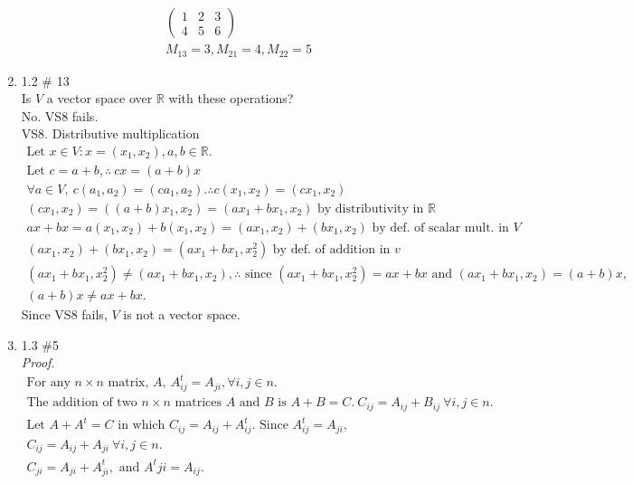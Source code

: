 \documentclass{article}
\begin{document}
\begin{enumerate}
\begin{gather*}
\begin{pmatrix}
            1 & 2 & 3 \\
            4 & 5 & 6
        \end{pmatrix} \\
        M_{13} = 3, M_{21} = 4, M_{22} = 5
    \end{gather*}
    \item 1.2 \# 13 \\
    Is $V$ a vector space over $\mathbb{R}$ with these operations? \\
    No. VS8 fails. \\
    VS8. Distributive multiplication
    \begin{gather*}
        \textrm{Let } x \in V : x = (x_1,x_2), a,b \in \mathbb{R}. \\
        \textrm{Let } c = a+b, \therefore \ cx = (a+b)x \\
        \forall a \in V, \ c(a_1,a_2) = (ca_1,a_2). \therefore c(x_1,x_2) = (cx_1,x_2) \\
        (cx_1,x_2) = ((a+b)x_1, x_2) = (ax_1 + bx_1, x_2) \textrm{ by distributivity in $\mathbb{R}$} \\
        ax+bx = a(x_1,x_2) + b(x_1,x_2) = (ax_1, x_2) + (bx_1, x_2) \textrm{ by def. of scalar mult. in $V$} \\
        (ax_1, x_2) + (bx_1, x_2) = (ax_1 + bx_1, x^2_2) \textrm{ by def. of addition in $v$} \\
        (ax_1 + bx_1, x^2_2) \neq (ax_1 + bx_1, x_2), \therefore \textrm{ since } (ax_1 + bx_1, x^2_2) = ax + bx \textrm{ and } (ax_1 + bx_1, x_2) = (a+b)x, \\
        (a+b)x \neq ax+bx.
    \end{gather*}
    Since VS8 fails, $V$ is not a vector space.
    \item 1.3 \#5 \\
    \textit{Proof.}
    \begin{gather*}
        \textrm{For any $n\times n$ matrix, } A, \ A^t_{ij} = A_{ji}, \forall i,j \in n. \\
        \textrm{The addition of two $n\times n$ matrices $A$ and $B$ is } A+B=C. \ C_{ij} = A_{ij}+B_{ij} \  \forall i,j \in n. \\
        \textrm{Let } A + A^t = C \textrm{ in which } C_{ij} = A_{ij} + A^t_{ij}. \textrm{ Since } A^t_{ij} = A_{ji}, \\
        C_{ij} = A_{ij} + A_{ji} \ \forall i,j \in n. \\
        C_{ji} = A_{ji} + A^t_{ji}, \textrm{ and } A^t{ji} = A_{ij}. \\

\end{gather*}
\end{enumerate}
\end{document}
